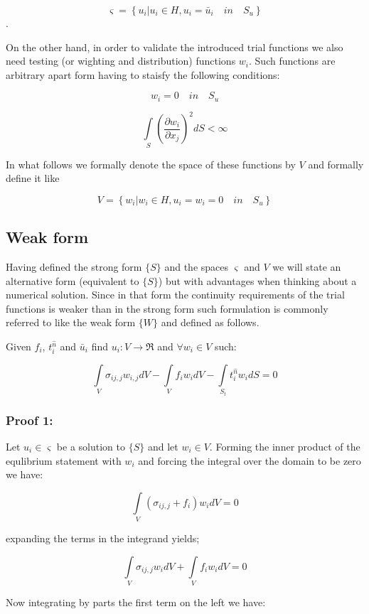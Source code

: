 \[ \varsigma = \left\{ {{u_i}\left| {{u_i} \in H,{u_i} = {{\bar u}_i} \quad in \quad {S_u}} \right.} \right\}\].

On the other hand, in order to validate the introduced trial functions we also need testing (or wighting and distribution) functions $w_i$. Such functions are arbitrary apart form having to staisfy the following conditions:

\[w_i=0 \quad in \quad {S_u}\]

\[\int\limits_S {{{\left( {\frac{{\partial {w_i}}}{{\partial {x_j}}}} \right)}^2}} dS < \infty \]

In what follows we formally denote the space of these functions by $V$ and formally define it like

\[ V = \left\{ {{w_i}\left| {{w_i} \in H,{u_i} = {w_i=0} \quad in \quad {S_u}} \right.} \right\}\]

\subsection*{Weak form}
Having defined the strong form $\{S\}$ and the spaces $\varsigma$ and $V$ we will state an alternative form (equivalent to $\{S\}$) but with advantages when thinking about a numerical solution. Since in that form the continuity requirements of the trial functions is weaker than in the strong form such formulation is commonly referred to like the weak form $\{W\}$ and defined as follows.

Given $f_i$, $t_i^{\hat n}$ and ${\bar u_i}$ find ${u_i}:V \to \Re$ and $\forall {w_i} \in V$ such:

\[\int\limits_V {{\sigma _{ij,j}}{w_{i,j}}dV - \int\limits_V {{f_i}{w_i}dV}  - \int\limits_{{S_t}} {t_i^{\hat n}} } {w_i}dS = 0\]

\subsubsection*{Proof 1:}
Let $u_i \in \varsigma $ be a solution to $\{S\}$ and let $w_i \in V $. Forming the inner product of the equlibrium statement with $w_i$ and forcing the integral over the domain to be zero we have:

\[\int\limits_V {\left( {{\sigma _{ij,j}} + {f_i}} \right){w_i}} dV = 0\]

expanding the terms in the integrand yields;

\[\int\limits_V {{\sigma _{ij,j}}{w_i}dV + \int\limits_V {{f_i}{w_i}dV = 0} } \]

Now integrating by parts the first term on the left we have:

